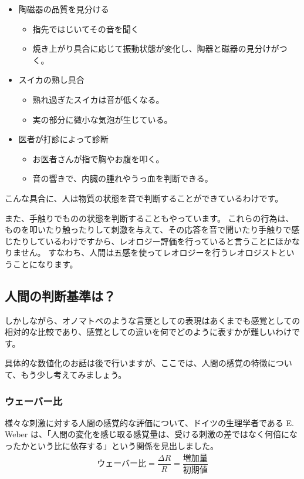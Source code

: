 \documentclass[uplatex,dvipdfmx,a4paper,11pt]{jsarticle}
\begin{document}
\begin{itemize}
	\item 陶磁器の品質を見分ける
	\begin{itemize}
		\item 指先ではじいてその音を聞く
		\item 焼き上がり具合に応じて振動状態が変化し、陶器と磁器の見分けがつく。
	\end{itemize}
	\item スイカの熟し具合
	\begin{itemize}
		\item 熟れ過ぎたスイカは音が低くなる。
		\item 実の部分に微小な気泡が生じている。
	\end{itemize}
	\item 医者が打診によって診断
	\begin{itemize}
		\item お医者さんが指で胸やお腹を叩く。
		\item 音の響きで、内臓の腫れやうっ血を判断できる。
	\end{itemize}
\end{itemize}

こんな具合に、人は物質の状態を音で判断することができているわけです。

また、手触りでものの状態を判断することもやっています。
これらの行為は、ものを叩いたり触ったりして刺激を与えて、その応答を音で聞いたり手触りで感じたりしているわけですから、レオロジー評価を行っていると言うことにほかなりません。
すなわち、人間は五感を使ってレオロジーを行うレオロジストということになります。

\subsection{人間の判断基準は？}

しかしながら、オノマトペのような言葉としての表現はあくまでも感覚としての相対的な比較であり、感覚としての違いを何でどのように表すかが難しいわけです。

具体的な数値化のお話は後で行いますが、ここでは、人間の感覚の特徴について、もう少し考えてみましょう。

\subsubsection{ウェーバー比}

様々な刺激に対する人間の感覚的な評価について、ドイツの生理学者である E. Weber は、「人間の変化を感じ取る感覚量は、受ける刺激の差ではなく何倍になったかという比に依存する」という関係を見出しました。
\begin{align*}
	\text{ウェーバー比} = \dfrac{\Delta R}{R}= \dfrac{\text{増加量}}{\text{初期値}}
\end{align*}
\end{document}
